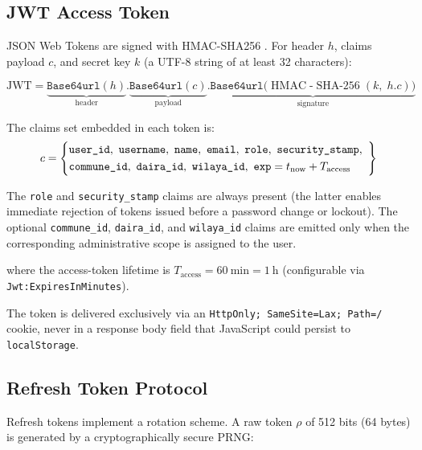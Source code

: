 \documentclass[12pt,a4paper]{article}
\theoremstyle{definition}
\theoremstyle{plain}
\theoremstyle{remark}
\newcommand{\HMAC}{\operatorname{HMAC}}
\newcommand{\SHA}{\operatorname{SHA\text{-}256}}
\begin{document}
\subsection{JWT Access Token}

JSON Web Tokens are signed with HMAC-SHA256 \cite{jwt_rfc,hmac_rfc}. For header $h$, claims
payload $c$, and secret key $k$ (a UTF-8 string of at least 32 characters):

\begin{equation}
  \text{JWT} =
    \underbrace{\texttt{Base64url}(h)}_{\text{header}}
    \texttt{.}
    \underbrace{\texttt{Base64url}(c)}_{\text{payload}}
    \texttt{.}
    \underbrace{\texttt{Base64url}\bigl(\HMAC\text{-}\SHA(k,\; h \texttt{.} c)\bigr)}_{\text{signature}}
  \label{eq:jwt}
\end{equation}

The claims set embedded in each token is:
\begin{equation}
  c = \left\{
    \begin{array}{@{}l}
      \texttt{user\_id},\ \texttt{username},\ \texttt{name},\ \texttt{email},\ \texttt{role},\ \texttt{security\_stamp},\\[3pt]
      \texttt{commune\_id},\ \texttt{daira\_id},\ \texttt{wilaya\_id},\ \texttt{exp} = t_{\text{now}} + T_{\text{access}}
    \end{array}
  \right\}
  \label{eq:jwt_claims}
\end{equation}

The \texttt{role} and \texttt{security\_stamp} claims are always present
(the latter enables immediate rejection of tokens issued before a password
change or lockout). The optional \texttt{commune\_id}, \texttt{daira\_id},
and \texttt{wilaya\_id} claims are emitted only when the corresponding
administrative scope is assigned to the user.

where the access-token lifetime is $T_{\text{access}} = 60\ \mathrm{min}
= 1\ \mathrm{h}$ (configurable via \texttt{Jwt\-:Expires\-In\-Minutes}).

The token is delivered exclusively via an \texttt{HttpOnly; SameSite=Lax;
Path=/} cookie, never in a response body field that JavaScript could
persist to \texttt{localStorage}.

\subsection{Refresh Token Protocol}
\label{sec:refresh}

Refresh tokens implement a rotation scheme. A raw token $\rho$ of 512 bits
(64 bytes) is generated by a cryptographically secure PRNG:
\end{document}
